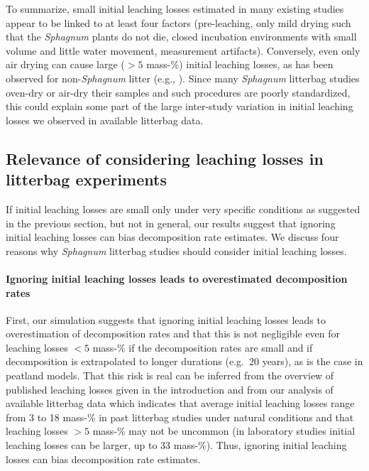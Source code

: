 \documentclass[bg, manuscript]{copernicus}
\begin{document}
To summarize, small initial leaching losses estimated in many existing studies appear to be linked to at least four factors (pre-leaching, only mild drying such that the \emph{Sphagnum} plants do not die, closed incubation environments with small volume and little water movement, measurement artifacts). Conversely, even only air drying can cause large (\(>5\) mass-\%) initial leaching losses, as has been observed for non-\emph{Sphagnum} litter (e.g., \citet{Barlocher.1997}). Since many \emph{Sphagnum} litterbag studies oven-dry or air-dry their samples and such procedures are poorly standardized, this could explain some part of the large inter-study variation in initial leaching losses we observed in available litterbag data.











\hypertarget{out-discussion-3}{%
\subsection{Relevance of considering leaching losses in litterbag experiments}\label{out-discussion-3}}

If initial leaching losses are small only under very specific conditions as suggested in the previous section, but not in general, our results suggest that ignoring initial leaching losses can bias decomposition rate estimates. We discuss four reasons why \emph{Sphagnum} litterbag studies should consider initial leaching losses.

\paragraph*{Ignoring initial leaching losses leads to overestimated decomposition rates}

First, our simulation suggests that ignoring initial leaching losses leads to overestimation of decomposition rates and that this is not negligible even for leaching losses \(<5\) mass-\% if the decomposition rates are small and if decomposition is extrapolated to longer durations (e.g.~20 years), as is the case in peatland models. That this risk is real can be inferred from the overview of published leaching losses given in the introduction and from our analysis of available litterbag data which indicates that average initial leaching losses range from 3 to 18 mass-\% in past litterbag studies under natural conditions and that leaching losses \(>5\) mass-\% may not be uncommon (in laboratory studies \citep{Bengtsson.2017} initial leaching losses can be larger, up to 33 mass-\%). Thus, ignoring initial leaching losses can bias decomposition rate estimates.
\end{document}
